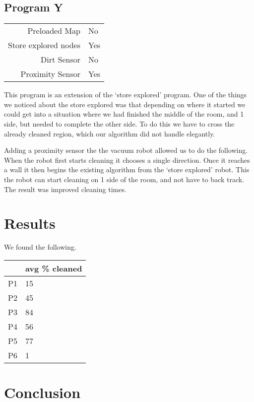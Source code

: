 \documentclass[letterpaper]{article}
\begin{document}
\subsection{Program Y}

\begin{tabular}{ r | l }  
	Preloaded Map			& No \\
	Store explored nodes	& Yes \\
	Dirt Sensor				& No \\
	Proximity Sensor		& Yes \\
\end{tabular}

This program is an extension of the `store explored' program.  One of the things we noticed about the store explored was that depending on where it started we could get into a situation where we had finished the middle of the room, and 1 side, but needed to complete the other side.  To do this we have to cross the already cleaned region, which our algorithm did not handle elegantly.

Adding a proximity sensor the the vacuum robot allowed us to do the following.  When the robot first starts cleaning it chooses a single direction.  Once it reaches a wall it then begins the existing algorithm from the `store explored' robot.  This the robot can start cleaning on 1 side of the room, and not have to back track.  The result was improved cleaning times.

\section{Results}

We found the following.

\begin{tabular}{ r | l }  
	\toprule
		& avg \% cleaned \\
	\midrule
	P1	& 15 \\
	P2	& 45 \\
	P3	& 84 \\
	P4	& 56 \\
	P5	& 77 \\
	P6	& 1 \\
	\bottomrule
\end{tabular}

\section{Conclusion}


\nocite{*}


\end{document}
